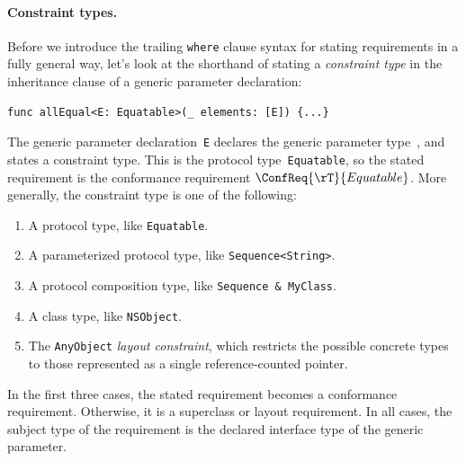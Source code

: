 \documentclass[../generics]{subfiles}
\begin{document}
\paragraph{Constraint types.}
Before we introduce the trailing \texttt{where} clause syntax for stating requirements in a fully general way, let's look at the shorthand of stating a \emph{constraint type} in the inheritance clause of a generic parameter declaration:
\begin{Verbatim}
func allEqual<E: Equatable>(_ elements: [E]) {...}
\end{Verbatim}
The generic parameter declaration~\texttt{E} declares the generic parameter type~\rT, and states a constraint type. This is the protocol type~\texttt{Equatable}, so the stated requirement is the conformance requirement $\ConfReq{\rT}{Equatable}$. More generally, the constraint type is one of the following:
\begin{enumerate}
\item A protocol type, like \texttt{Equatable}.
\item A parameterized protocol type, like \texttt{Sequence<String>}.
\item A protocol composition type, like \texttt{Sequence \& MyClass}.
\item A class type, like \texttt{NSObject}.
\item The \texttt{AnyObject} \emph{layout constraint}, which restricts the possible concrete types to those represented as a single reference-counted pointer.
\end{enumerate}
In the first three cases, the stated requirement becomes a conformance requirement. Otherwise, it is a superclass or layout requirement. In all cases, the subject type of the requirement is the declared interface type of the generic parameter.
\end{document}
